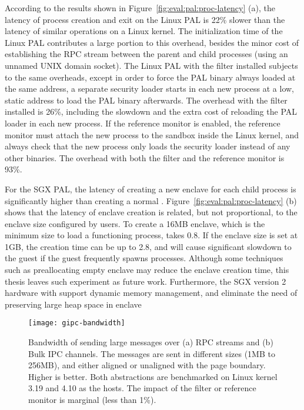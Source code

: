According to the results shown in
Figure~\ref{fig:eval:pal:proc-latency} (a),
the latency of process creation and exit
on the Linux PAL
is \roughly{}22\% slower than
the latency of similar operations
on a Linux kernel.
The initialization time of the Linux PAL
contributes a large portion to this overhead, besides the minor cost of establishing the RPC stream
between the parent and child processes (using an unnamed UNIX domain socket).
The Linux PAL
with the \seccomp{} filter installed
subjects to the same overheads,
except in order to force the PAL binary always loaded
at the same address,
a separate security loader starts
in each new process
at a low, static address
to load the PAL binary afterwards. 
The overhead with the \seccomp{} filter installed
is \roughly{}26\%,
including the \linuxapi{} slowdown
and the extra cost of reloading the PAL loader in each new process.
If the reference monitor
is enabled,
the reference monitor
must attach the new process to the sandbox
inside the Linux kernel,
and always check that the new process only loads the security loader instead of any other binaries.
The overhead with both the \seccomp{} filter
and the reference monitor
is \roughly{}93\%.



For the SGX PAL,
the latency of creating a new enclave for each child process
is significantly higher
than creating a normal \picoproc{}.
Figure~\ref{fig:eval:pal:proc-latency} (b)
shows that the latency of enclave creation
is related, but not proportional,
to the enclave size configured by users.
To create a 16MB enclave,
which is the minimum size to load a functioning \graphene{} process,
takes \roughly{}0.8\asec{}.
If the enclave size is set at 1GB, the creation time can be up to \roughly{}2.8\asec{},
and will cause significant slowdown
to the guest if the guest frequently spawns processes.
Although some techniques such as
preallocating empty enclave may reduce
the enclave creation time,
this thesis leaves such experiment as future work.
Furthermore,
the SGX version 2 hardware
with support dynamic memory management,
and eliminate the need of preserving large heap space in enclave






 








\begin{figure*}[t!]
\centering
\footnotesize
\texttt{[image: gipc-bandwidth]}
\caption{Bandwidth of sending large messages over (a) RPC streams and (b) Bulk IPC channels. The messages are sent in different sizes (1MB to 256MB), and either aligned or unaligned with the page boundary.
Higher is better. Both abstractions are benchmarked on Linux kernel 3.19 and 4.10 as the hosts. The impact of the \seccomp{} filter or reference monitor is marginal (less than 1\%).}
\label{fig:eval:pal:gipc-bandwidth}
\end{figure*}


